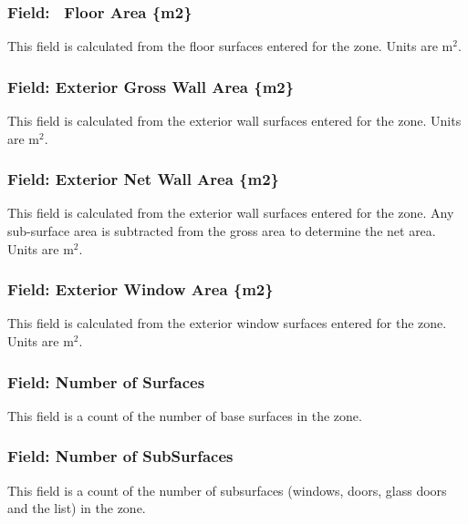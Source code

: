 \subsubsection{Field:~ Floor Area \{m2\}}\label{field-floor-area-m2}

This field is calculated from the floor surfaces entered for the zone. Units are m\(^{2}\).

\subsubsection{Field: Exterior Gross Wall Area \{m2\}}\label{field-exterior-gross-wall-area-m2}

This field is calculated from the exterior wall surfaces entered for the zone. Units are m\(^{2}\).

\subsubsection{Field: Exterior Net Wall Area \{m2\}}\label{field-exterior-net-wall-area-m2}

This field is calculated from the exterior wall surfaces entered for the zone. Any sub-surface area is subtracted from the gross area to determine the net area. Units are m\(^{2}\).

\subsubsection{Field: Exterior Window Area \{m2\}}\label{field-exterior-window-area-m2}

This field is calculated from the exterior window surfaces entered for the zone. Units are m\(^{2}\).

\subsubsection{Field: Number of Surfaces}\label{field-number-of-surfaces-1}

This field is a count of the number of base surfaces in the zone.

\subsubsection{Field: Number of SubSurfaces}\label{field-number-of-subsurfaces-1}

This field is a count of the number of subsurfaces (windows, doors, glass doors and the list) in the zone.

